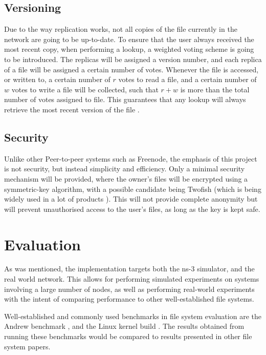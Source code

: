 \documentclass[8pt,a4paper]{article}
\begin{document}
\subsection{Versioning}
Due to the way replication works, not all copies of the file currently in the network are going to be up-to-date. To ensure that the user always received the most recent copy, when performing a lookup, a weighted voting scheme is going to be introduced. The replicas will be assigned a version number, and each replica of a file will be assigned a certain number of votes. Whenever the file is accessed, or written to, a certain number of $r$ votes to read a file, and a certain number of $w$ votes to write a file will be collected, such that $r + w$ is more than the total number of votes assigned to file. This guarantees that any lookup will always retrieve the most recent version of the file \cite{versioning}.

\subsection{Security}

Unlike other Peer-to-peer systems such as Freenode, the emphasis of this project is not security, but instead simplicity and efficiency. Only a minimal security mechanism will be provided, where the owner's files will be encrypted using a symmetric-key algorithm, with a possible candidate being Twofish (which is being widely used in a lot of products \cite{twofishprod}).
This will not provide complete anonymity but will prevent unauthorised access to the user's files, as long as the key is kept safe.


\section{Evaluation}

As was mentioned, the implementation targets both the ns-3 \cite{ns3} simulator, and the real world network. This allows for performing simulated experiments on systems involving a large number of nodes, as well as performing real-world experiments with the intent of comparing performance to other well-established file systems.

Well-established and commonly used benchmarks in file system evaluation are the Andrew benchmark \cite{andrew}, and the Linux kernel build \cite{kernelb}. The results obtained from running these benchmarks would be compared to results presented in other file system papers.
\end{document}
